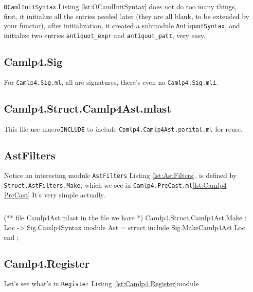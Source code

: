 \inputminted[fontsize=\scriptsize,
firstline=55]{ocaml}{camlp4/code/PreCast_OCamlInitSyntax.ml}
\verb|OCamlInitSyntax| Listing \ref{lst:OCamlInitSyntax} does not do
too many things, first, it initialize all the entries needed later
(they are all blank, to be extended by your functor), after
initialization, it created a submodule \verb|AntiquotSyntax|, and
initialize two entries \verb|antiquot_expr| and \verb|antiquot_patt|,
very easy.


\subsection{Camlp4.Sig}
For \verb|Camlp4.Sig.ml|, all are signatures, there's even no
\verb|Camlp4.Sig.mli|.



\subsection{Camlp4.Struct.Camlp4Ast.mlast} 

This file use macro\verb|INCLUDE| to include
\verb|Camlp4.Camlp4Ast.parital.ml| for reuse.


\subsection{AstFilters}    
Notice an interesting module \verb|AstFilters| Listing
\ref{lst:AstFilters}, is defined by \verb|Struct.AstFilters.Make|,
which we see in \verb|Camlp4.PreCast.ml|\ref{lst:Camlp4 PreCast} It's
very simple actually.


\inputminted[fontsize=\scriptsize,]{ocaml}{camlp4/code/AstFilters.ml}



\begin{ocamlcode}
(** file Camlp4Ast.mlast   in the file we have *)
Camlp4.Struct.Camlp4Ast.Make : Loc -> Sig.Camlp4Syntax
  module Ast = struct
     include Sig.MakeCamlp4Ast Loc 
  end ;
\end{ocamlcode}


\subsection{Camlp4.Register}
Let's see what's in \verb|Register| Listing \ref{lst:Camlp4 Register}module


